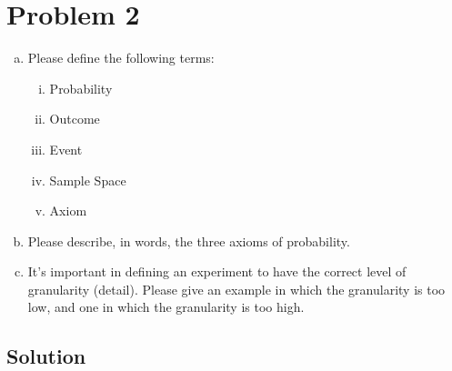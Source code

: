 \section{Problem 2}
\begin{enumerate}[a.]
	\item Please define the following terms:
	\begin{enumerate}[(i)]
		\item Probability
		\item Outcome
		\item Event
		\item Sample Space
		\item Axiom
	\end{enumerate}
	\item Please describe, in words, the three axioms of probability.
	\item  It's important in defining an experiment to have the correct level of granularity (detail). Please give an example in which the granularity is too low, and one in which the granularity is too high.
\end{enumerate}

\subsection{Solution}

